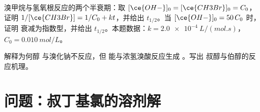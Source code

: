 \begin{exercise}[$\star\star\star$]\label{exo:b1:nucleophilic-substitution:11}
溴甲烷与氢氧根反应的两个半衰期：取
$[\ce{OH-}]_0 = [\ce{CH3Br}]_0 = C_0$，证明 $1/[\ce{CH3Br}] = 1/C_0 +
kt$，并给出 $t_{1/2}$。当 $[\ce{OH-}]_0 = 50\,C_0$ 时，证明
衰减为指数型，并给出 $t_{1/2}$。本题数据：$k =
\qty{2.0e-4}{L/(mol.s)}$，$C_0 = \qty{0.010}{mol/L}$。
\end{exercise}

\begin{exercise}[$\star\star\star$]\label{exo:b1:nucleophilic-substitution:12}
解释为何醇  与溴化钠不反应，但
能与浓氢溴酸反应生成 。写出
叔醇与伯醇的反应机理。
\end{exercise}

\section{问题：叔丁基氯的溶剂解}

